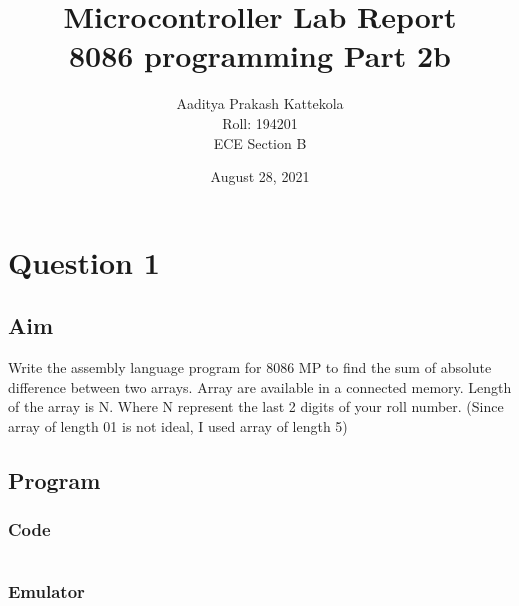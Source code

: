 \documentclass{article}
\title{
	Microcontroller Lab Report \\
\large 8086 programming Part 2b
} %
\author{
	Aaditya Prakash Kattekola \\
	{\small Roll: 194201} \\
	{\small ECE Section B} \\
} %
\date{August 28, 2021} %
\begin{document}
\maketitle %



\break
\section{Question 1}

\subsection{Aim}
Write the assembly language program for 8086 MP to find the sum of absolute difference between two arrays. Array are available in a connected memory. Length of the array is N. Where N represent the last 2 digits of your roll number. 
(Since array of length 01 is not ideal, I used array of length 5)

\subsection{Program}
\subsubsection{Code}
\inputminted{nasm}{"C:/Users/aadit/Documents/BTech/5th Semester/MC Lab/8086 Pgrm 2/2B/SAD.asm"}

\subsubsection{Emulator}
\end{document}
